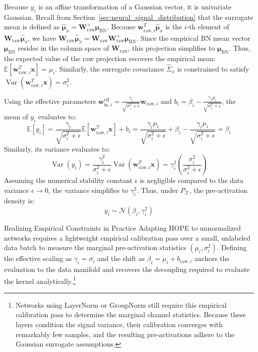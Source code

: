 \documentclass[11pt, a4paper, copyright, gdm]{google}
\newcommand{\wVect}{\boldsymbol{w}}
\newcommand{\xVect}{\boldsymbol{x}}
\newcommand{\muVect}{\boldsymbol{\mu}}
\newcommand{\calN}{\mathcal{N}}
\newcommand{\calX}{\mathcal{X}}
\newcommand{\E}{\mathbb{E}}
\newcommand{\Wmat}{\boldsymbol{W}}
\DeclareMathOperator{\Var}{Var}
\theoremstyle{definition}
\begin{document}
Because $y_i$ is an affine transformation of a Gaussian vector, it is univariate Gaussian. Recall from Section~\ref{sec:neural_signal_distribution} that the surrogate mean is defined as $\hat{\muVect}_x = \Wmat_{\text{raw}}^+ \muVect_{\text{BN}}$. Because $\wVect_{\text{raw},i}^T \hat{\muVect}_x$ is the $i$-th element of $\Wmat_{\text{raw}} \hat{\muVect}_x$, we have $\Wmat_{\text{raw}} \hat{\muVect}_x = \Wmat_{\text{raw}} \Wmat_{\text{raw}}^+ \muVect_{\text{BN}}$. Since the empirical BN mean vector $\muVect_{\text{BN}}$ resides in the column space of $\Wmat_{\text{raw}}$, this projection simplifies to $\muVect_{\text{BN}}$. Thus, the expected value of the raw projection recovers the empirical mean: $\E[\wVect_{\text{raw},i}^T \xVect] = \mu_i$. Similarly, the surrogate covariance $\hat{\Sigma}_x$ is constrained to satisfy $\Var(\wVect_{\text{raw},i}^T \xVect) = \sigma_i^2$.

Using the effective parameters $\wVect_{\text{in},i}^{\text{eff}} = \frac{\gamma_i}{\sqrt{\sigma_i^2 + \epsilon}} \wVect_{\text{raw},i}$ and $b_i = \beta_i - \frac{\gamma_i \mu_i}{\sqrt{\sigma_i^2 + \epsilon}}$, the mean of $y_i$ evaluates to:
\begin{equation}
    \E[y_i] = \frac{\gamma_i}{\sqrt{\sigma_i^2 + \epsilon}} \E[\wVect_{\text{raw},i}^T \xVect] + b_i = \frac{\gamma_i \mu_i}{\sqrt{\sigma_i^2 + \epsilon}} + \beta_i - \frac{\gamma_i \mu_i}{\sqrt{\sigma_i^2 + \epsilon}} = \beta_i
\end{equation}
Similarly, its variance evaluates to:
\begin{equation}
    \Var(y_i) = \frac{\gamma_i^2}{\sigma_i^2 + \epsilon} \Var(\wVect_{\text{raw},i}^T \xVect) = \gamma_i^2 \left( \frac{\sigma_i^2}{\sigma_i^2 + \epsilon} \right)
\end{equation}
Assuming the numerical stability constant $\epsilon$ is negligible compared to the data variance $\epsilon \to 0$, the variance simplifies to $\gamma_i^2$. Thus, under $P_{\calX}$, the pre-activation density is:
\begin{equation}
\label{eq:pre-activation_density_appendix}
y_i \sim \calN(\beta_i, \gamma_i^2)
\end{equation}

\begin{alertbox}{Realizing Empirical Constraints in Practice}
Adapting HOPE to unnormalized networks requires a lightweight empirical calibration pass over a small, unlabeled data batch to measure the marginal pre-activation statistics $(\mu_i, \sigma_i^2)$. Defining the effective scaling as $\gamma_i = \sigma_i$ and the shift as $\beta_i = \mu_i + b_{\text{raw}, i}$ anchors the evaluation to the data manifold and recovers the decoupling required to evaluate the kernel analytically.\footnote{Networks using LayerNorm or GroupNorm still require this empirical calibration pass to determine the marginal channel statistics. Because these layers condition the signal variance, their calibration converges with remarkably few samples, and the resulting pre-activations adhere to the Gaussian surrogate assumptions.}
\end{alertbox}
\end{document}
